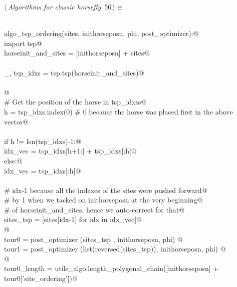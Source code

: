 \documentclass[11.5pt]{report}
\begin{document}
\begin{flushleft} \small\label{scrap80}\raggedright\small
{} $\langle\,${\itshape Algorithms for classic horsefly}\nobreak\ {\footnotesize {56}}$\,\rangle\equiv$
\vspace{-1ex}
\begin{list}{}{} \item
\mbox{}\verb@@\\
\mbox{}\verb@def algo_tsp_ordering(sites, inithorseposn, phi, post_optimizer):@\\
\mbox{}\verb@    import tsp@\\
\mbox{}\verb@    horseinit_and_sites = [inithorseposn] + sites@\\
\mbox{}\verb@@\\
\mbox{}\verb@    _, tsp_idxs = tsp.tsp(horseinit_and_sites)@\\
\mbox{}\verb@@\\
\mbox{}\verb@          @\\
\mbox{}\verb@    # Get the position of the horse in tsp_idxss@\\
\mbox{}\verb@    h = tsp_idxs.index(0) # 0 because the horse was placed first in the above vector@\\
\mbox{}\verb@@\\
\mbox{}\verb@    if h != len(tsp_idxs)-1:@\\
\mbox{}\verb@        idx_vec = tsp_idxs[h+1:] + tsp_idxs[:h]@\\
\mbox{}\verb@    else:@\\
\mbox{}\verb@        idx_vec = tsp_idxs[:h]@\\
\mbox{}\verb@@\\
\mbox{}\verb@    # idx-1 because all the indexes of the sites were pushed forward@\\
\mbox{}\verb@    # by 1 when we tacked on inithorseposn at the very beginning@\\
\mbox{}\verb@    # of horseinit_and_sites, hence we auto-correct for that@\\
\mbox{}\verb@    sites_tsp = [sites[idx-1] for idx in idx_vec]@\\
\mbox{}\verb@    @\\
\mbox{}\verb@    tour0    = post_optimizer (sites_tsp                , inithorseposn, phi) @\\
\mbox{}\verb@    tour1    = post_optimizer (list(reversed(sites_tsp)), inithorseposn, phi) @\\
\mbox{}\verb@    @\\
\mbox{}\verb@    tour0_length = utils_algo.length_polygonal_chain([inithorseposn] + tour0['site_ordering'])@\\

\end{list}
\end{flushleft}
\end{document}
